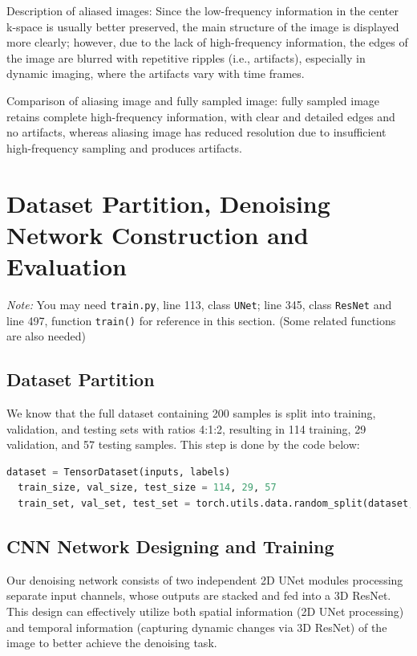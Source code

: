 \documentclass{article}
\begin{document}
Description of aliased images: Since the low-frequency information in the center k-space 
is usually better preserved, the main structure of the image is displayed more clearly; 
however, due to the lack of high-frequency information, the edges of the image are 
blurred with repetitive ripples (i.e., artifacts), especially in dynamic imaging, 
where the artifacts vary with time frames.

Comparison of aliasing image and fully sampled image: fully sampled image retains 
complete high-frequency information, with clear and detailed edges and no artifacts, 
whereas aliasing image has reduced resolution due to insufficient high-frequency 
sampling and produces artifacts.



\section{Dataset Partition, Denoising Network Construction and Evaluation}
\textit{Note: }You may need \texttt{train.py}, line 113, class \texttt{UNet};
 line 345, class \texttt{ResNet} and line 497, function \texttt{train()} 
 for reference in this section. (Some related functions are also needed)
 
\subsection{Dataset Partition}

We know that the full dataset containing 200 samples is split into training, validation, 
and testing sets with ratios 4:1:2, resulting in 114 training, 29 validation, 
and 57 testing samples. This step is done by the code below:
\begin{lstlisting}[language=Python, caption={Dataset Partition}, label={lst:train_code}]
  dataset = TensorDataset(inputs, labels)
  train_size, val_size, test_size = 114, 29, 57
  train_set, val_set, test_set = torch.utils.data.random_split(dataset, [train_size, val_size, test_size])
\end{lstlisting}

\subsection{CNN Network Designing and Training}
Our denoising network consists of two independent 2D UNet modules processing 
separate input channels, whose outputs are stacked and fed into a 3D ResNet. 
This design can effectively utilize both spatial information (2D UNet processing) 
and temporal information (capturing dynamic changes via 3D ResNet) of the image 
to better achieve the denoising task.
\end{document}
